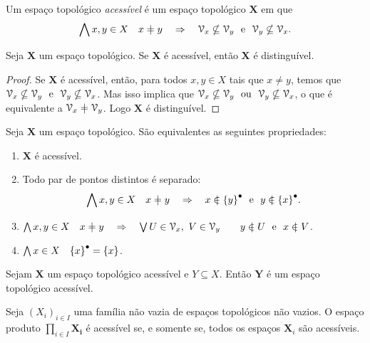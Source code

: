 \begin{definition}[$T_1$]
Um espaço topológico \emph{acessível} é um espaço topológico $\bm X$ em que
	\begin{equation*}
	\forall x,y \in X \quad x \neq y \quad \Rightarrow \quad \viz_x \nsubseteq \viz_y \text{\ \ e\ \ } \viz_y \nsubseteq \viz_x.
	\end{equation*}
\end{definition}

\begin{proposition}[$T_1 \Rightarrow T_0$]
Seja $\bm X$ um espaço topológico. Se $\bm X$ é acessível, então $\bm X$ é distinguível.
\end{proposition}
\begin{proof}
Se $\bm X$ é acessível, então, para todos $x,y \in X$ tais que $x \neq y$, temos que $\viz_x \nsubseteq \viz_y \text{\ \ e\ \ } \viz_y \nsubseteq \viz_x$. Mas isso implica que $\mathcal{V}_x \nsubseteq \mathcal{V}_y \text{\ \ ou\ \ } \mathcal{V}_y \nsubseteq \mathcal{V}_x$, o que é equivalente a $\viz_x \neq \viz_y$. Logo $\bm X$ é distinguível.
\end{proof}

\begin{proposition}
Seja $\bm X$ um espaço topológico. São equivalentes as seguintes propriedades:
	\begin{enumerate}
	\item $\bm X$ é acessível.
	\item Todo par de pontos distintos é separado:
		\begin{equation*}
		\forall x,y \in X \quad x \neq y \quad \Rightarrow \quad x \notin \Fec{\{y\}} \text{\ \ e\ \ } y \notin \Fec{\{x\}}.
		\end{equation*}
	\item $\forall x,y \in X \quad x \neq y \quad \Rightarrow \quad \exists U \in \viz_x,\ V \in \viz_y \qquad y \notin U \text{\ \ e\ \ } x \notin V$.
	\item $\bigwedge\nolimits x \in X \quad {\{x\}}^\bullet=\{x\}$.
	\end{enumerate}
\end{proposition}

\begin{proposition}
Sejam $\bm X$ um espaço topológico acessível e  $Y \subseteq X$. Então $\bm Y$ é um espaço topológico acessível.
\end{proposition}

\begin{proposition}
Seja $(X_i)_{i \in I}$ uma família não vazia de espaços topológicos não vazios. O espaço produto $\prod_{i \in I} \bm{X_i}$ é acessível se, e somente se, todos os espaços $\bm X_i$ são acessíveis.
\end{proposition}

